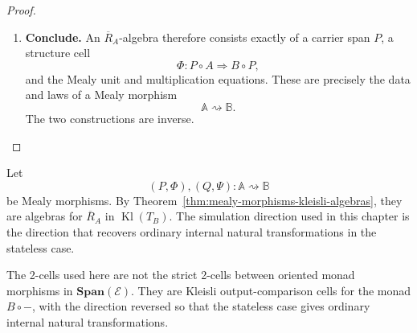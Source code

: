 \begin{proof}
\begin{enumerate}
        \item \textbf{Conclude.}
        An \(\overline R_A\)-algebra therefore consists exactly of a carrier
        span \(P\), a structure cell
        \[
            \Phi:P\circ A\Rightarrow B\circ P,
        \]
        and the Mealy unit and multiplication equations. These are precisely
        the data and laws of a Mealy morphism
        \[
            \mathbb A\rightsquigarrow\mathbb B.
        \]
        The two constructions are inverse.
    \end{enumerate}
\end{proof}

Let
\[
    (P,\Phi),(Q,\Psi):\mathbb A\rightsquigarrow\mathbb B
\]
be Mealy morphisms. By Theorem~\ref{thm:mealy-morphisms-kleisli-algebras}, they are algebras for \(\overline R_A\) in \(\operatorname{Kl}(T_B)\). The simulation direction used in this chapter is the direction that recovers ordinary internal natural transformations in the stateless case.

The 2-cells used here are not the strict 2-cells between oriented monad morphisms in \(\mathbf{Span}(\mathcal E)\). They are Kleisli output-comparison cells for the monad \(B\circ-\), with the direction reversed so that the stateless case gives ordinary internal natural transformations.

